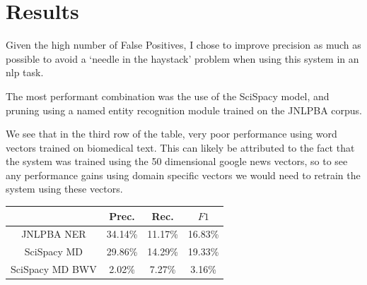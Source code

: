\documentclass[11pt]{article}
\begin{document}
\section{Results}
Given the high number of False Positives, I chose to improve precision as much as possible to avoid a ‘needle in the haystack’ problem when using this system in an nlp task.

The most performant combination was the use of the SciSpacy model, and pruning using a named entity recognition module trained on the JNLPBA corpus.

We see that in the third row of the table, very poor performance using word vectors trained on biomedical text. This can likely be attributed to the fact that the system was trained using the 50 dimensional google news vectors, so to see any performance gains using domain specific vectors we would need to retrain the system using these vectors.
\begin{center}
 \begin{tabular}{||c c c c||} 
 \hline
  &  Prec.  & Rec. & $F1$ \\ [0.5ex] 
 \hline\hline
     JNLPBA NER & 34.14\% & 11.17\% & 16.83\% \\ 
     SciSpacy MD & 29.86\% & 14.29\% & 19.33\% \\ 
     SciSpacy MD BWV & 2.02\% & 7.27\% & 3.16\% \\ 
 \hline
\end{tabular}
\end{center}
\newpage



\nocite{pilehvar-collier-2016-improved, choi-etal-2014-analysis, Prokofyev:2015:SOC:2942298.2942337, clark-manning-2016-improving}
\end{document}
